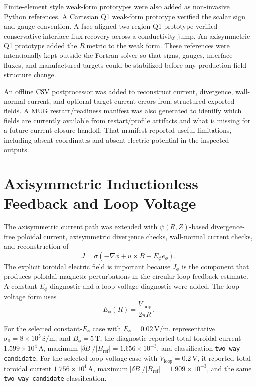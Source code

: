 \documentclass[11pt]{article}
\begin{document}
Finite-element style weak-form prototypes were also added as non-invasive Python references. A Cartesian Q1 weak-form prototype verified the scalar sign and gauge convention. A face-aligned two-region Q1 prototype verified conservative interface flux recovery across a conductivity jump. An axisymmetric Q1 prototype added the \(R\) metric to the weak form. These references were intentionally kept outside the Fortran solver so that signs, gauges, interface fluxes, and manufactured targets could be stabilized before any production field-structure change.

An offline CSV postprocessor was added to reconstruct current, divergence, wall-normal current, and optional target-current errors from structured exported fields. A MUG restart/readiness manifest was also generated to identify which fields are currently available from restart/profile artifacts and what is missing for a future current-closure handoff. That manifest reported useful limitations, including absent coordinates and absent electric potential in the inspected outputs.

\section{Axisymmetric Inductionless Feedback and Loop Voltage}

The axisymmetric current path was extended with \(\psi(R,Z)\)-based divergence-free poloidal current, axisymmetric divergence checks, wall-normal current checks, and reconstruction of
\[
J = \sigma(-\nabla\phi + u\times B + E_\phi e_\phi).
\]
The explicit toroidal electric field is important because \(J_\phi\) is the component that produces poloidal magnetic perturbations in the circular-loop feedback estimate. A constant-\(E_\phi\) diagnostic and a loop-voltage diagnostic were added. The loop-voltage form uses
\[
E_\phi(R) = \frac{V_{\mathrm{loop}}}{2\pi R}.
\]

For the selected constant-\(E_\phi\) case with \(E_\phi = 0.02\,\mathrm{V/m}\), representative \(\sigma_0 = 8\times 10^5\,\mathrm{S/m}\), and \(B_\phi=5\,\mathrm{T}\), the diagnostic reported total toroidal current \(1.599\times 10^4\,\mathrm{A}\), maximum \(|\delta B|/|B_{\mathrm{ref}}| = 1.656\times 10^{-3}\), and classification \texttt{two-way-candidate}. For the selected loop-voltage case with \(V_{\mathrm{loop}}=0.2\,\mathrm{V}\), it reported total toroidal current \(1.756\times 10^4\,\mathrm{A}\), maximum \(|\delta B|/|B_{\mathrm{ref}}| = 1.909\times 10^{-3}\), and the same \texttt{two-way-candidate} classification.
\end{document}
